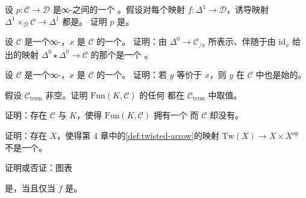 \begin{exercise}\label{ex:inner-fibration-joyal-equivalence-fibrewise}
设 $p\colon \mathcal{C} \to \mathcal{D}$ 是∞-\trCategories{}之间的一个%
\trInnerFibration{}。假设对每个映射 $f\colon \Delta^1 \to \mathcal{D}$，诱导映射
$\Delta^1 \times_{\mathcal{D}} \mathcal{C} \to \Delta^1$ 都是\trJoyalEquivalence{}。
证明 $p$ 是\trJoyalEquivalence{}。
\end{exercise}

\begin{exercise}\label{ex:terminal-object-slice}
设 $\mathcal{C}$ 是一个∞-\trCategory{}，$x$ 是 $\mathcal{C}$ 的一个\trObject{}。
证明：由 $\Delta^0 \to \mathcal{C}_{/x}$ 所表示、伴随于由 $\mathrm{id}_x$ 给出的映射
$\Delta^0 \star \Delta^0 \to \mathcal{C}$ 的那个\trObject{}是一个%
\trTerminalObject{}。
\end{exercise}

\begin{exercise}\label{ex:initial-closed-under-equivalence}
设 $\mathcal{C}$ 是一个∞-\trCategory{}，$x$ 是 $\mathcal{C}$ 的一个\trInitialObject{}。
证明：若 $y$ 等价于 $x$，则 $y$ 在 $\mathcal{C}$ 中也是始的。
\end{exercise}

\begin{exercise}\label{ex:terminal-functor-values}
假设 $\mathcal{C}_{\mathrm{term}}$ 非空。证明 $\mathrm{Fun}(K, \mathcal{C})$ 的任何%
\trTerminalObject{}都在 $\mathcal{C}_{\mathrm{term}}$ 中取值。
\end{exercise}

\begin{exercise}\label{ex:fun-terminal-not-c}
证明：存在 $\mathcal{C}$ 与 $K$，使得 $\mathrm{Fun}(K, \mathcal{C})$ 拥有一个%
\trTerminalObject{}而 $\mathcal{C}$ 却没有。
\end{exercise}

\begin{exercise}\label{ex:twisted-arrow-not-right-fibration}
证明：存在\trSimplicialSet{} $X$，使得第 4 章中的\cref{def:twisted-arrow}的映射
$\mathrm{Tw}(X) \to X \times X^{\mathrm{op}}$ 不是一个\trRightFibration{}。
\end{exercise}

\begin{exercise}\label{ex:homotopy-cartesian-fully-faithful}
证明或否证：图表
\begin{center}
\end{center}
是\trHomotopyCartesian{}，当且仅当 $f$ 是\trFullyFaithful{}。
\end{exercise}


